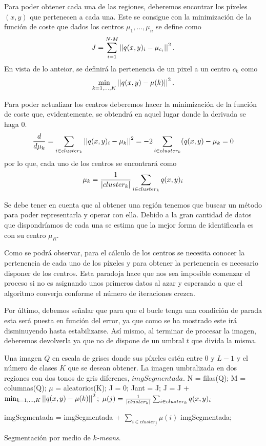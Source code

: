 \documentclass[main]{subfiles}
\begin{document}
Para poder obtener cada una de las regiones, deberemos encontrar los píxeles $(x,y)$ que pertenecen a cada una. Este se consigue con la minimización de la función de coste que dados los centros $\mu_1, \dots,\mu_n$ se define como
$$J=\sum_{i=1}^{N\cdot M}\left\vert\left\vert q(x,y)_i-\mu_{c_i}\right\vert\right\vert^2.$$
En vista de lo anteior, se definirá la pertenencia de un pixel a un centro $c_k$ como
$$\min_{k=1,\dots,K} \left\vert\left\vert q(x,y)-\mu(k)\right\vert\right\vert^2.$$

Para poder actualizar los centros deberemos hacer la minimización de la función de coste que, evidentemente, se obtendrá en aquel lugar donde la derivada se haga 0.
$$\frac{d}{d \mu_k} = \sum_{i\in cluster_k} \left\vert\left\vert q(x,y)_i-\mu_k\right\vert\right\vert^2 = -2\sum_{i\in cluster_k}(q(x,y)-\mu_k=0$$
por lo que, cada uno de los centros se encontrará como
$$\mu_k = \frac{1}{\left\vert cluster_k\right\vert}\sum_{i\in cluster_k}q(x,y)_i$$

Se debe tener en cuenta que al obtener una región tenemos que buscar un método para poder representarla y operar con ella. Debido a la gran cantidad de datos que dispondríamos de cada una se estima que la mejor forma de identificarla es con su centro $\mu_R$.

Como se podrá observar, para el cálculo de los centros se necesita conocer la pertenencia de cada uno de los píxeles y para obtener la pertenencia es necesario disponer de los centros. Esta paradoja hace que nos sea imposible comenzar el proceso si no es asignando unos primeros datos al azar y esperando a que el algoritmo converja conforme el número de iteraciones crezca.

Por último, debemos señalar que para que el bucle tenga una condición de parada esta será puesta en función del error, ya que como se ha mostrado este irá disminuyendo hasta estabilizarse. Así mismo, al terminar de procesar la imagen, deberemos devolverla ya que no de dispone de un umbral $t$ que divida la misma.

\begin{algorithm}
\begin{algorithmic}[1]
\REQUIRE Una imagen $Q$ en escala de grises donde sus píxeles estén entre $0$ y $L-1$ y el número de clases $K$ que se desean obtener.
\ENSURE La imagen umbralizada en dos regiones con dos tonos de gris diferenes, $imgSegmentada$.
\STATE N = filas(Q);
\STATE M = columnas(Q);
\STATE $\mu$ = aleatorios(K);
\STATE J = 0;
\REPEAT
    \STATE Jant = J;
            \STATE J = J + $\min_{k=1,\dots,K} \left\vert\left\vert q(x,y)-\mu(k)\right\vert\right\vert^2;$
        \ENDFOR
    \ENDFOR
        \STATE $\mu(j) = \frac{1}{\left\vert cluster_k\right\vert}\sum_{i\in cluster_k}q(x,y)_i$
    \ENDFOR
{}

    \STATE imgSegmentada = imgSegmentada + $\sum_{i\in cluster_j}\mu(i)$
\ENDFOR
\RETURN imgSegmentada;
\end{algorithmic}
\caption{Segmentación por medio de {\em $k$-means}.}\label{alg:kmeans}
\end{algorithm}
\end{document}
